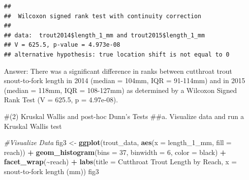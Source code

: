 \documentclass[
]{article}
\newenvironment{Shaded}{\begin{snugshade}}{\end{snugshade}}
\newcommand{\AttributeTok}[1]{\textcolor[rgb]{0.13,0.29,0.53}{#1}}
\newcommand{\CommentTok}[1]{\textcolor[rgb]{0.56,0.35,0.01}{\textit{#1}}}
\newcommand{\ConstantTok}[1]{\textcolor[rgb]{0.56,0.35,0.01}{#1}}
\newcommand{\DecValTok}[1]{\textcolor[rgb]{0.00,0.00,0.81}{#1}}
\newcommand{\FunctionTok}[1]{\textcolor[rgb]{0.13,0.29,0.53}{\textbf{#1}}}
\newcommand{\NormalTok}[1]{#1}
\newcommand{\OtherTok}[1]{\textcolor[rgb]{0.56,0.35,0.01}{#1}}
\newcommand{\SpecialCharTok}[1]{\textcolor[rgb]{0.81,0.36,0.00}{\textbf{#1}}}
\newcommand{\StringTok}[1]{\textcolor[rgb]{0.31,0.60,0.02}{#1}}
\begin{document}
\begin{Shaded}
\end{Shaded}

\begin{verbatim}
## 
##  Wilcoxon signed rank test with continuity correction
## 
## data:  trout2014$length_1_mm and trout2015$length_1_mm
## V = 625.5, p-value = 4.973e-08
## alternative hypothesis: true location shift is not equal to 0
\end{verbatim}

Answer: There was a significant difference in ranks between cutthroat
trout snout-to-fork length in 2014 (median = 104mm, IQR = 91-114mm) and
in 2015 (median = 118mm, IQR = 108-127mm) as determined by a Wilcoxon
Signed Rank Test (V = 625.5, p = 4.97e-08).

\#(2) Kruskal Wallis and post-hoc Dunn's Tests \#\#a. Visualize data and
run a Kruskal Wallis test

\begin{Shaded}
\begin{Highlighting}[]
\CommentTok{\#Visualize Data}
\NormalTok{fig3 }\OtherTok{\textless{}{-}} \FunctionTok{ggplot}\NormalTok{(trout\_data, }\FunctionTok{aes}\NormalTok{(}\AttributeTok{x =}\NormalTok{ length\_1\_mm, }\AttributeTok{fill =}\NormalTok{ reach)) }\SpecialCharTok{+}
  \FunctionTok{geom\_histogram}\NormalTok{(}\AttributeTok{bins =} \DecValTok{37}\NormalTok{, }\AttributeTok{binwidth =} \DecValTok{6}\NormalTok{, }\AttributeTok{color =} \StringTok{\textquotesingle{}black\textquotesingle{}}\NormalTok{) }\SpecialCharTok{+}
  \FunctionTok{facet\_wrap}\NormalTok{(}\SpecialCharTok{\textasciitilde{}}\NormalTok{reach) }\SpecialCharTok{+}
  \FunctionTok{labs}\NormalTok{(}\AttributeTok{title =} \StringTok{\textquotesingle{}Cutthroat Trout Length by Reach\textquotesingle{}}\NormalTok{, }
       \AttributeTok{x =} \StringTok{\textquotesingle{}snout{-}to{-}fork length (mm)\textquotesingle{}}\NormalTok{)}
\NormalTok{fig3}
\end{Highlighting}
\end{Shaded}
\end{document}
